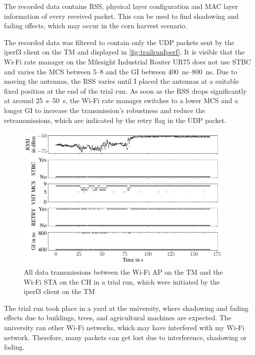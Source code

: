 The recorded data contains \ac{RSS}, physical layer configuration and MAC layer information of every received packet.
This can be used to find shadowing and fading effects, which may occur in the corn harvest scenario.

The recorded data was filtered to contain only the \ac{UDP} packets sent by the iperf3 client on the \ac{TM}
and displayed in \autoref{fig:trailrunIperf}.
It is visible that the Wi-Fi rate manager on the Milesight Industrial Router UR75 does not use \ac{STBC} and varies
the \ac{MCS} between \numrange{5}{8} and the \ac{GI} between \SIrange{400}{800}{\nano\second}.
Due to moving the antennas, the \ac{RSS} varies until I placed the antennas at a suitable fixed position at the end of the trial run.
As soon as the \ac{RSS} drops significantly at around \SIrange{25}{50}{\second}, the Wi-Fi rate manager switches to a lower \ac{MCS} and a longer
\ac{GI} to increase the transmission's robustness and reduce the retransmissions, which are indicated by the retry flag in the \ac{UDP} packet.

\begin{figure}[]%
   \centering
   \includegraphics[width=0.95\textwidth]{figures/wireless5_144}
   \caption{All data transmissions between the Wi-Fi \acf{AP} on the \acf{TM} and the Wi-Fi \ac{STA} on the \acf{CH} in a trial run,
   which were initiated by the iperf3 client on the \acf{TM}}
   \label{fig:trailrunIperf}%
\end{figure}

The trial run took place in a yard at the university, where shadowing and fading effects due to buildings, trees, and agricultural machines are
expected.
The university ran other Wi-Fi networks, which may have interfered with my Wi-Fi network.
Therefore, many packets can get lost due to interference, shadowing or fading.

